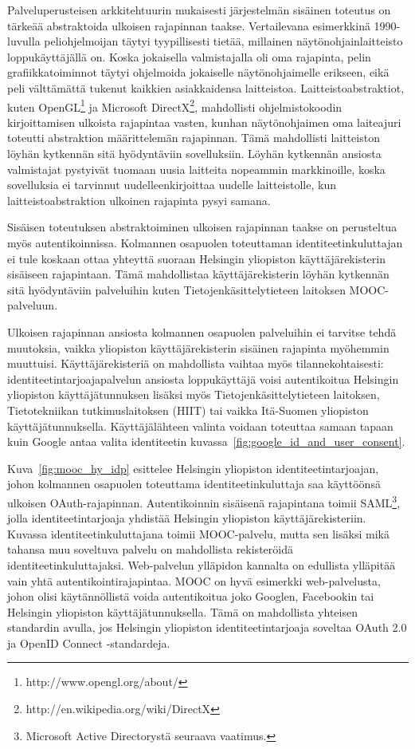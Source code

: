 \documentclass[finnish,gradu]{tktltiki}
\begin{document}
  Palveluperusteisen arkkitehtuurin mukaisesti järjestelmän sisäinen toteutus on tärkeää abstraktoida ulkoisen rajapinnan taakse. Vertailevana esimerkkinä 1990-luvulla peliohjelmoijan täytyi tyypillisesti tietää, millainen näytönohjainlaitteisto loppukäyttäjällä on. Koska jokaisella valmistajalla oli oma rajapinta, pelin grafiikkatoiminnot täytyi ohjelmoida jokaiselle näytönohjaimelle erikseen, eikä peli välttämättä tukenut kaikkien asiakkaidensa laitteistoa. Laitteistoabstraktiot, kuten OpenGL\footnote{http://www.opengl.org/about/} ja Microsoft DirectX\footnote{http://en.wikipedia.org/wiki/DirectX}, mahdollisti ohjelmistokoodin kirjoittamisen ulkoista rajapintaa vasten, kunhan näytönohjaimen oma laiteajuri toteutti abstraktion määrittelemän rajapinnan. Tämä mahdollisti laitteiston löyhän kytkennän sitä hyödyntäviin sovelluksiin. Löyhän kytkennän ansiosta valmistajat pystyivät tuomaan uusia laitteita nopeammin markkinoille, koska sovelluksia ei tarvinnut uudelleenkirjoittaa uudelle laitteistolle, kun laitteistoabstraktion ulkoinen rajapinta pysyi samana.

  Sisäisen toteutuksen abstraktoiminen ulkoisen rajapinnan taakse on perusteltua myös autentikoinnissa. Kolmannen osapuolen toteuttaman identiteetinkuluttajan ei tule koskaan ottaa yhteyttä suoraan Helsingin yliopiston käyttäjärekisterin sisäiseen rajapintaan. Tämä mahdollistaa käyttäjärekisterin löyhän kytkennän sitä hyödyntäviin palveluihin kuten Tietojenkäsittelytieteen laitoksen MOOC-palveluun.

  Ulkoisen rajapinnan ansiosta kolmannen osapuolen palveluihin ei tarvitse tehdä muutoksia, vaikka yliopiston käyttäjärekisterin sisäinen rajapinta myöhemmin muuttuisi. Käyttäjärekisteriä on mahdollista vaihtaa myös tilannekohtaisesti: identiteetintarjoajapalvelun ansiosta loppukäyttäjä voisi autentikoitua Helsingin yliopiston käyttäjätunnuksen lisäksi myös Tietojenkäsittelytieteen laitoksen, Tietotekniikan tutkimuslaitoksen (HIIT) tai vaikka Itä-Suomen yliopiston käyttäjätunnuksella. Käyttäjälähteen valinta voidaan toteuttaa samaan tapaan kuin Google antaa valita identiteetin kuvassa~\ref{fig:google_id_and_user_consent}.

  Kuva~\ref{fig:mooc_hy_idp} esittelee Helsingin yliopiston identiteetintarjoajan, johon kolmannen osapuolen toteuttama identiteetinkuluttaja saa käyttöönsä ulkoisen OAuth-rajapinnan. Autentikoinnin sisäisenä rajapintana toimii SAML\footnote{Microsoft Active Directorystä seuraava vaatimus.}, jolla identiteetintarjoaja yhdistää Helsingin yliopiston käyttäjärekisteriin. Kuvassa identiteetinkuluttajana toimii MOOC-palvelu, mutta sen lisäksi mikä tahansa muu soveltuva palvelu on mahdollista rekisteröidä identiteetinkuluttajaksi. Web-palvelun ylläpidon kannalta on edullista ylläpitää vain yhtä autentikointirajapintaa. MOOC on hyvä esimerkki web-palvelusta, johon olisi käytännöllistä voida autentikoitua joko Googlen, Facebookin tai Helsingin yliopiston käyttäjätunnuksella. Tämä on mahdollista yhteisen standardin avulla, jos Helsingin yliopiston identiteetintarjoaja soveltaa OAuth 2.0 ja OpenID Connect -standardeja.
\end{document}
